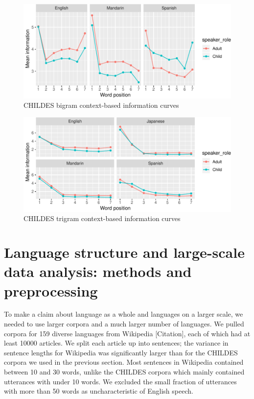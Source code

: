 \documentclass[11pt,]{article}
\begin{document}
\begin{figure}
\centering
\includegraphics{paper_files/figure-latex/unnamed-chunk-5-1.pdf}
\caption{\label{fig:unnamed-chunk-5}CHILDES bigram context-based information curves}
\end{figure}

\begin{figure}
\centering
\includegraphics{paper_files/figure-latex/unnamed-chunk-6-1.pdf}
\caption{\label{fig:unnamed-chunk-6}CHILDES trigram context-based information curves}
\end{figure}

\hypertarget{language-structure-and-large-scale-data-analysis-methods-and-preprocessing}{%
\section{Language structure and large-scale data analysis: methods and preprocessing}\label{language-structure-and-large-scale-data-analysis-methods-and-preprocessing}}

To make a claim about language as a whole and languages on a larger scale, we needed to use larger corpora and a much larger number of languages. We pulled corpora for 159 diverse languages from Wikipedia {[}Citation{]}, each of which had at least 10000 articles. We split each article up into sentences; the variance in sentence lengths for Wikipedia was significantly larger than for the CHILDES corpora we used in the previous section. Most sentences in Wikipedia contained between 10 and 30 words, unlike the CHILDES corpora which mainly contained utterances with under 10 words. We excluded the small fraction of utterances with more than 50 words as uncharacteristic of English speech.
\end{document}

